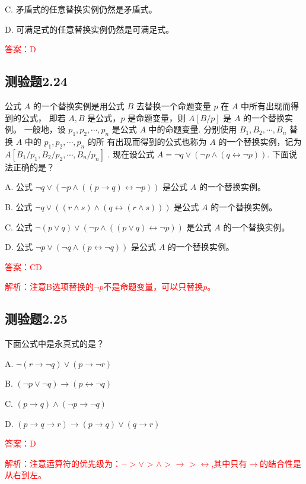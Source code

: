 \documentclass[UTF8, heading=true]{ctexart}
\begin{document}
C. 矛盾式的任意替换实例仍然是矛盾式。

D. 可满足式的任意替换实例仍然是可满足式。

\textcolor{red}{答案：D}

\subsection{测验题2.24}

公式 $A$ 的一个替换实例是用公式 $B$ 去替换一个命题变量 $p$ 在 $A$ 中所有出现而得到的公式，
即若 $A, B$ 是公式，$p$ 是命题变量，则 $A[B / p]$ 是 $A$ 的一个替换实例。
一般地，设 $p_1, p_2, \cdots, p_n$ 是公式 $A$ 中的命题变量. 
分别使用 $B_1, B_2, \cdots, B_n$ 替换 $A$ 中的 $p_1, p_2, \cdots, p_n$ 的所
有出现而得到的公式也称为 $A$ 的一个替换实例，记为 $A\left[B_1 / p_1, B_2 / p_2, \cdots, B_n / p_n\right]$ . 
现在设公式 $A=\neg q \vee(\neg p \wedge(q \leftrightarrow \neg p))$.
 下面说法正确的是？

A. 
公式 $\neg q \vee(\neg p \wedge((p \rightarrow q) \leftrightarrow \neg p))$ 是公式 $A$ 的一个替换实例。

B. 
公式 $\neg q \vee((r \wedge s) \wedge(q \leftrightarrow(r \wedge s)))$ 是公式 $A$ 的一个替换实例。

C. 
公式 $\neg(p \vee q) \vee(\neg p \wedge((p \vee q) \leftrightarrow \neg p))$ 是公式 $A$ 的一个替换实例。

D. 
公式 $\neg p \vee(\neg q \wedge(p \leftrightarrow \neg q))$ 是公式 $A$ 的一个替换实例。


\textcolor{red}{答案：CD}

\textcolor{red}{解析：注意B选项替换的$\neg p$不是命题变量，可以只替换$p$。}

\subsection{测验题2.25}

下面公式中是永真式的是？

A. $ \neg(r \rightarrow \neg q) \vee(p \rightarrow \neg r)$

B. $(\neg p \vee \neg q) \rightarrow(p \leftrightarrow \neg q)$

C. $(p \rightarrow q) \wedge(\neg p \rightarrow \neg q)$

D. $(p \rightarrow q \rightarrow r) \rightarrow(p \rightarrow q) \vee(q \rightarrow r)$

\textcolor{red}{答案：D}

\textcolor{red}{解析：注意运算符的优先级为：$\neg$ >  $\vee$ > $\wedge$ > $\rightarrow$ > $\leftrightarrow$,其中只有$\rightarrow$的结合性是从右到左。}
\end{document}

